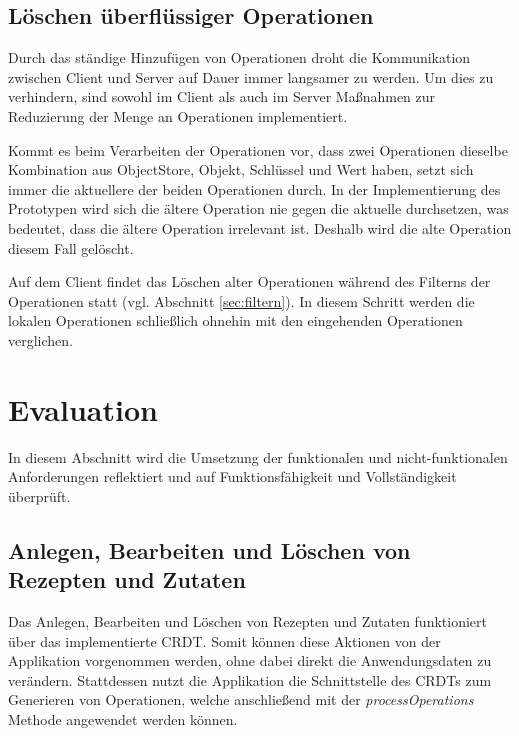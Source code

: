 \documentclass[a4paper, 12pt]{scrreprt}
\begin{document}
\section{Löschen überflüssiger Operationen}

Durch das ständige Hinzufügen von Operationen droht die Kommunikation zwischen Client und Server auf Dauer immer langsamer zu werden. Um dies zu verhindern, sind sowohl im Client als auch im Server Maßnahmen zur Reduzierung der Menge an Operationen implementiert.

Kommt es beim Verarbeiten der Operationen vor, dass zwei Operationen dieselbe Kombination aus ObjectStore, Objekt, Schlüssel und Wert haben, setzt sich immer die aktuellere der beiden Operationen durch. In der Implementierung des Prototypen wird sich die ältere Operation nie gegen die aktuelle durchsetzen, was bedeutet, dass die ältere Operation irrelevant ist. Deshalb wird die alte Operation diesem Fall gelöscht. 

Auf dem Client findet das Löschen alter Operationen während des Filterns der Operationen statt (vgl. Abschnitt \ref{sec:filtern}). In diesem Schritt werden die lokalen Operationen schließlich ohnehin mit den eingehenden Operationen verglichen.

\begin{minipage}{\linewidth}
	
\end{minipage}

\chapter{Evaluation}

In diesem Abschnitt wird die Umsetzung der funktionalen und nicht-funktionalen Anforderungen reflektiert und auf Funktionsfähigkeit und Vollständigkeit überprüft.

\section{Anlegen, Bearbeiten und Löschen von Rezepten und Zutaten}
Das Anlegen, Bearbeiten und Löschen von Rezepten und Zutaten funktioniert über das implementierte CRDT. Somit können diese Aktionen von der Applikation vorgenommen werden, ohne dabei direkt die Anwendungsdaten zu verändern. Stattdessen nutzt die Applikation die Schnittstelle des \acp{CRDT} zum Generieren von Operationen, welche anschließend mit der \textit{processOperations} Methode angewendet werden können.
\end{document}
